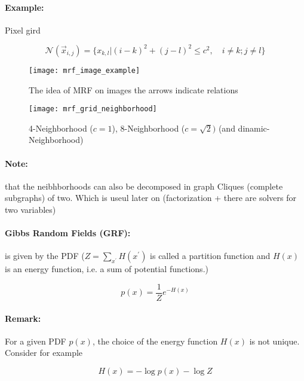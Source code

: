 \paragraph{Example:}
Pixel gird

\begin{equation*}
	\mathcal{N}(\vec{x}_{i,j}) = \{x_{k,l}| (i-k)^2 + (j-l)^2 \le c^2, \quad i \not = k ; j \not = l\}
\end{equation*}

\begin{figure}[H]
  \centering
  \begin{minipage}[b]{0.45\textwidth}
    \texttt{[image: mrf\_image\_example]}
		\caption{The idea of MRF on images the arrows indicate relations}
  \end{minipage}
  \begin{minipage}[b]{0.45\textwidth}
    \texttt{[image: mrf\_grid\_neighborhood]}
		\caption{4-Neighborhood ($c=1$), 8-Neighborhood ($c=\sqrt{2})$ (and dinamic-Neighborhood)}
  \end{minipage}
\end{figure}

\paragraph{Note:} that the neibhborhoods can also be decomposed in graph Cliques (complete subgraphs) of two. Which is useul later on (factorization + there are solvers for two variables)

\paragraph{Gibbs Random Fields (GRF):} is given by the PDF ($Z = \sum_{x^\prime} H(x^{\prime})$ is called a partition function and $H(x)$ is an energy function, i.e. a sum of potential functions.)

\begin{equation*}
	p(x) = \frac{1}{Z} e^{-H(x)}
\end{equation*}

\paragraph{Remark:}
For a given PDF $p(x)$, the choice of the energy function $H(x)$ is not unique. Consider for example

\begin{equation*}
	H(x) = - \log p(x) - \log Z
\end{equation*}

